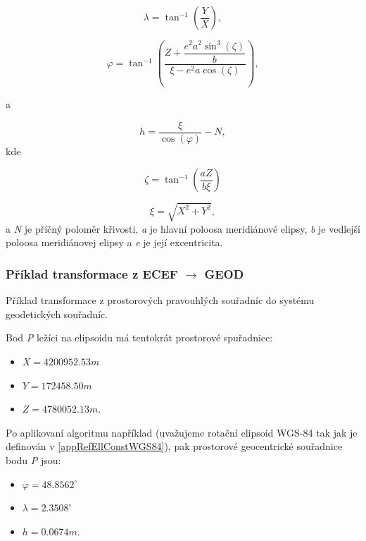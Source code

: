 \documentclass[11pt,a4paper]{article}
\begin{document}
\begin{equation}
\lambda = \tan^{-1}{\left(\dfrac{Y}{X}\right)},
\end{equation} 

\begin{equation}
\varphi = \tan^{-1}{\left(\dfrac{Z+\dfrac{e^{2}a^{2}\sin^{3}{\left(\zeta\right)}}{b}}{\xi-e^{2}a\cos{\left(\zeta\right)}}\right)},
\end{equation} 

a

\begin{equation}
h = \dfrac{\xi}{\cos{\left(\varphi\right)}} - N,
\end{equation}
kde

\begin{equation}
\zeta = \tan^{-1}{\left(\dfrac{aZ}{b\xi}\right)}
\end{equation}

\begin{equation}
\xi = \sqrt{X^{2} + Y^{2}}, 
\end{equation}
a \textit{N} je příčný poloměr křivosti, \textit{a} je hlavní poloosa meridiánové elipsy, \textit{b} je vedlejší poloosa meridiánovej elipsy a \textit{e} je její excentricita.

\subsubsection{Příklad transformace z ECEF $\rightarrow$ GEOD}

Příklad transformace z prostorových pravouhlých souřadníc do systému geodetických souřadníc.

Bod \textit{P} ležíci na elipsoidu má tentokrát prostorové  spuřadnice:
\begin{itemize}
\item $X = 4200952.53 m$
\item $Y = 172458.50 m$
\item $Z = 4780052.13 m.$
\end{itemize}

Po aplikovaní algoritmu například \cite{Vermeille2011} (uvažujeme rotační elipsoid WGS-84 tak jak je definován v \ref{appRefEllConstWGS84}), pak prostorové geocentrické souřadnice bodu \textit{P} jsou:
\begin{itemize}
\item $\varphi = 48.8562^{\circ}$
\item $\lambda = 2.3508^{\circ}$
\item $h = 0.0674 m.$
\end{itemize}
\end{document}
